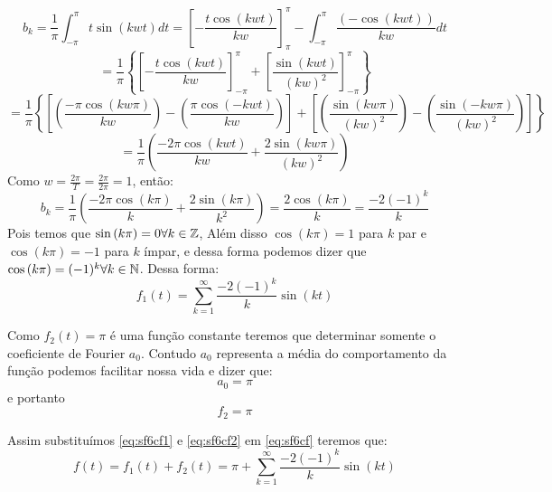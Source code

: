 \begin{equation*}
    b_k = \frac{1}{\pi}\int_{-\pi}^\pi t\sin{(kwt)}dt = \left[-\frac{t\cos{(kwt)}}{kw}\right]^\pi_{\pi} - \int_{-\pi}^\pi\frac{(-\cos{(kwt)})}{kw}dt
\end{equation*}
\begin{equation*}
    = \frac{1}{\pi}\left\{\left[-\frac{t\cos{(kwt)}}{kw}\right]^\pi_{-\pi} + \left[\frac{\sin{(kwt)}}{(kw)^2}\right]^\pi_{-\pi}\right\}
\end{equation*}
\begin{equation*}
    = \frac{1}{\pi}\left\{\left[\left(\frac{-\pi\cos{(kw\pi)}}{kw}\right) - \left(\frac{\pi\cos{(-kwt)}}{kw}\right)\right] + \left[\left(\frac{\sin{(kw\pi)}}{(kw)^2}\right)-\left(\frac{\sin{(-kw\pi)}}{(kw)^2}\right)\right] \right\}
\end{equation*}
\begin{equation*}
    = \frac{1}{\pi}\left(\frac{-2\pi\cos{(kwt)}}{kw} + \frac{2\sin{(kw\pi)}}{(kw)^2}\right)
\end{equation*}
Como $w = \frac{2\pi}{T} = \frac{2\pi}{2\pi} = 1$, então:
\begin{equation}
    b_k = \frac{1}{\pi}\left(\frac{-2\pi\cos{(k\pi)}}{k} + \frac{2\sin{(k\pi)}}{k^2}\right) = \frac{2\cos{(k\pi)}}{k} = \frac{-2(-1)^k}{k}
\end{equation}
Pois temos que $\sin{(k\pi)} = 0 \forall k \in \mathbb{Z}$, Além disso $\cos{(k\pi)} = 1$ para $k$ par e $\cos{(k\pi)} = -1$ para $k$ ímpar, e dessa forma podemos dizer que $\cos{(k\pi)} = (-1)^k \forall k \in \mathbb{N}$. Dessa forma:
\begin{equation}
    \label{eq:sf6cf1}
    f_1(t) = \sum^\infty_{k=1} \frac{-2(-1)^k}{k}\sin{(kt)}
\end{equation}

Como $f_2(t)=\pi$ é uma função constante teremos que determinar somente o coeficiente de Fourier $a_0$. Contudo $a_0$ representa a média do comportamento da função podemos facilitar nossa vida e dizer que:
\begin{equation*}
    a_0 = \pi
\end{equation*}
e portanto 
\begin{equation}
    \label{eq:sf6cf2}
    f_2 = \pi
\end{equation}

Assim substituímos \ref{eq:sf6cf1} e \ref{eq:sf6cf2} em \ref{eq:sf6cf} teremos que:
\begin{equation}
    \label{sf6c}
    f(t) = f_1(t) + f_2(t) = \boxed{\pi + \sum^\infty_{k=1} \frac{-2(-1)^k}{k}\sin{(kt)}}
\end{equation}